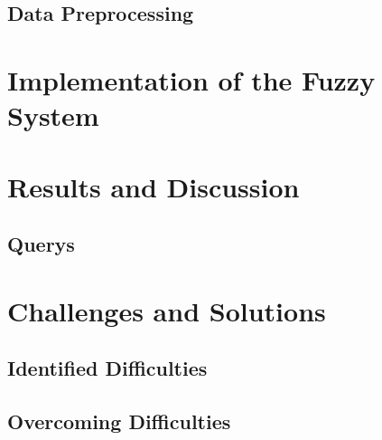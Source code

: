 \documentclass[fleqn,11pt]{article}
\begin{document}
\subsection{Data Preprocessing}

\section{Implementation of the Fuzzy System}


\section{Results and Discussion}


\subsection{Querys}

\section{Challenges and Solutions}

\subsection{Identified Difficulties}



\subsection{Overcoming Difficulties}
\end{document}
